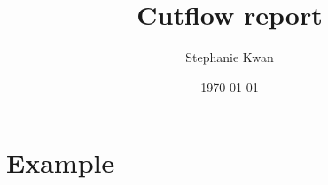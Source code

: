 \documentclass[11pt]{article}
\title{Cutflow report}
\author{ Stephanie Kwan }
\date{\today}
\begin{document}
\maketitle

\tableofcontents



\section{Example}



\end{document}
